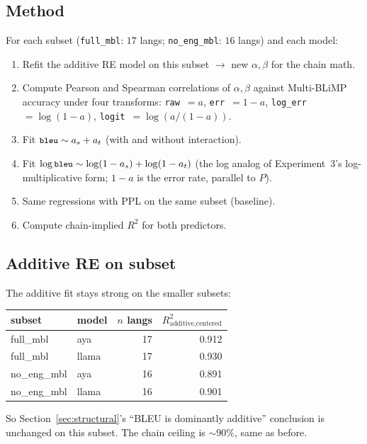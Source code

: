 \documentclass[11pt]{article}
\newcommand{\code}[1]{\texttt{\small #1}}
\begin{document}
\subsection{Method}

For each subset (\code{full\_mbl}: $17$ langs; \code{no\_eng\_mbl}:
$16$ langs) and each model:

\begin{enumerate}
  \item Refit the additive RE model on this subset $\to$ new $\alpha,
    \beta$ for the chain math.
  \item Compute Pearson and Spearman correlations of $\alpha, \beta$
    against Multi-BLiMP accuracy under four transforms:
    \code{raw}~$= a$, \code{err}~$= 1 - a$, \code{log\_err}~$=
    \log(1 - a)$, \code{logit}~$= \log(a/(1-a))$.
  \item Fit $\code{bleu} \sim a_s + a_t$ (with and without
    interaction).
  \item Fit $\log\code{bleu} \sim \log(1 - a_s) + \log(1 - a_t)$
    (the log analog of Experiment~3's log-multiplicative form;
    $1 - a$ is the error rate, parallel to $P$).
  \item Same regressions with PPL on the same subset (baseline).
  \item Compute chain-implied $R^2$ for both predictors.
\end{enumerate}

\subsection{Additive RE on subset}

The additive fit stays strong on the smaller subsets:

\begin{center}
\small
\begin{tabular}{llrr}
\toprule
subset & model & $n$ langs & $R^2_{\text{additive,centered}}$ \\
\midrule
full\_mbl   & aya   & 17 & 0.912 \\
full\_mbl   & llama & 17 & 0.930 \\
no\_eng\_mbl & aya   & 16 & 0.891 \\
no\_eng\_mbl & llama & 16 & 0.901 \\
\bottomrule
\end{tabular}
\end{center}

So Section~\ref{sec:structural}'s ``BLEU is dominantly additive''
conclusion is unchanged on this subset. The chain ceiling is $\sim
90\%$, same as before.
\end{document}
